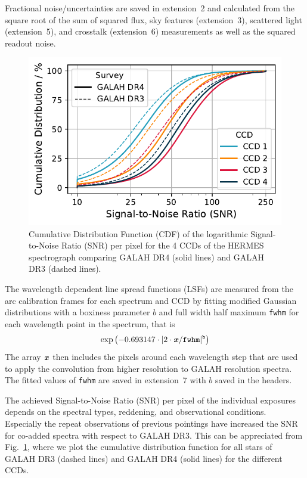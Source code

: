 \documentclass[
  journal=pasa,
  manuscript=research-paper, %
  year=2024,
  volume=37
]{cup-journal}
\begin{document}
Fractional noise/uncertainties are saved in extension~2 and calculated from the square root of the sum of squared flux, sky features (extension~3), scattered light (extension~5), and crosstalk (extension~6) measurements as well as the squared readout noise.

\begin{figure}[ht]
    \centering
    \includegraphics[width=\columnwidth]{figures/snr_distribution.pdf}
    \caption{Cumulative Distribution Function (CDF) of the logarithmic Signal-to-Noise Ratio (SNR) per pixel for the 4 CCDs of the HERMES spectrograph comparing GALAH DR4 (solid lines) and GALAH DR3 (dashed lines).}
    \label{fig:snr_distribution}
\end{figure}

The wavelength dependent line spread functions (LSFs) are measured from the arc calibration frames for each spectrum and CCD by fitting modified Gaussian distributions with a boxiness parameter $b$ and full width half maximum \texttt{fwhm} for each wavelength point in the spectrum, that is
\begin{align}
    \exp \left(-0.693147 \cdot \vert 2 \cdot \textbf{\textit{x}}/\texttt{fwhm} \vert^\texttt{b}\right) \label{eq:lsf}
\end{align}
The array $\textbf{\textit{x}}$ then includes the pixels around each wavelength step that are used to apply the convolution from higher resolution to GALAH resolution spectra. The fitted values of \texttt{fwhm} are saved in extension~7 with $b$ saved in the headers.

The achieved Signal-to-Noise Ratio (SNR) per pixel of the individual exposures depends on the spectral types, reddening, and observational conditions. Especially the repeat observations of previous pointings have increased the SNR for co-added spectra with respect to GALAH DR3. This can be appreciated from Fig.~\ref{fig:snr_distribution}, where we plot the cumulative distribution function for all stars of GALAH DR3 (dashed lines) and GALAH DR4 (solid lines) for the different CCDs. 
\end{document}
